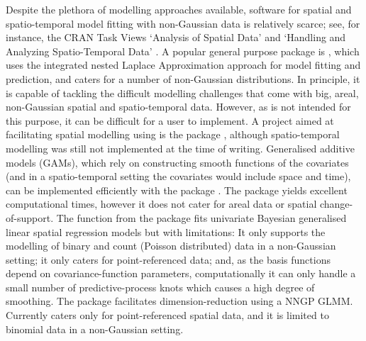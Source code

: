 \documentclass[nojss]{jss}
\newcommand{\fct}[1]{\code{#1()}}
\begin{document}
Despite the plethora of modelling approaches available, software for spatial and spatio-temporal model fitting with non-Gaussian data is relatively scarce; see, for instance, the CRAN Task Views `Analysis of Spatial Data' \citep{CRAN_Task_View:spatial} and `Handling and Analyzing Spatio-Temporal Data' \citep{CRAN_Task_View:spatio-temporal}. 
A popular general purpose  package is  \citep{Lindgren_2015_R-INLA}, which uses the integrated nested Laplace Approximation \citep{Rue_2009_INLA} approach for model fitting and prediction, and caters for a number of non-Gaussian distributions. 
In principle, it is capable of tackling the difficult modelling challenges that come with big, areal, non-Gaussian spatial and spatio-temporal data. However, as  is not intended for this purpose, it can be difficult for a user to implement. 
A project aimed at facilitating spatial modelling using  is the  package \citep{Bachl_2019_inlabru}, although spatio-temporal modelling was still not implemented at the time of writing.
Generalised additive models (GAMs), which rely on constructing smooth functions of the covariates (and in a spatio-temporal setting the covariates would include space and time),  can be implemented efficiently with the package  \citep{Wood_2017_GAM:R}. 
The package yields excellent computational times, however it does not cater for areal data or spatial change-of-support.
The function \fct{spGLM} from the package  \citep{Finley_2015_spBayes} fits univariate Bayesian generalised linear spatial regression models but with limitations: It only supports the modelling of binary and count (Poisson distributed) data in a non-Gaussian setting; it only caters for point-referenced data; and, as the basis functions depend on covariance-function parameters, computationally it can only handle a small number of predictive-process knots which causes a high degree of smoothing.
The package  \citep{Finley_2020_spNNGP} facilitates dimension-reduction using a NNGP GLMM. %
 Currently  caters only for point-referenced spatial data, and it is limited to binomial data in a non-Gaussian setting. 
 
 
\end{document}
